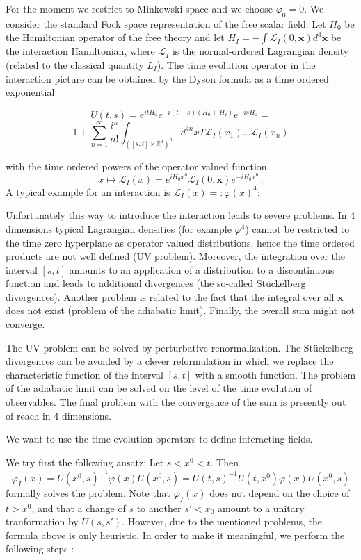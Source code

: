 \documentclass[12pt]{article}
\newcommand{\Lcal}{\mathcal {L}}
\newcommand{\ph}{\varphi}
\newcommand{\1}{\mathds{1}}                         %
\begin{document}
{{For the moment we restrict to Minkowski space and we choose $\ph_0=0$. We consider the standard Fock space representation of the free scalar field. Let $H_0$ be the Hamiltonian operator of the free theory and let  $H_I=-\int  \Lcal_I(0,\mathbf x)d^3\mathbf x$ be the interaction Hamiltonian, where $\Lcal_I$ is the normal-ordered Lagrangian density (related to the classical quantity ${L_I}$). The time evolution operator in the interaction picture can be obtained by the Dyson formula as a time ordered exponential

{\[U(t,s)=e^{itH_0}e^{-i(t-s)(H_0+H_I)}e^{-isH_0}=\]
\[1+\sum_{n=1}^\infty\frac{i^n}{n!}\int_ {([s,t]\times\mathbb R^3)^n}d^{4n}xT\Lcal_I(x_1)\dots \Lcal_I(x_n)\]}
%
{with the time ordered powers of the operator valued function
\[x\mapsto \Lcal_I(x)=e^{iH_0x^0}\Lcal_I(0,\mathbf x)e^{-iH_0x^0}\,.
\]
{A typical example for an interaction is $\Lcal_I(x)=:\ph(x)^4:$}

Unfortunately this way to introduce the interaction leads to severe problems. In 4 dimensions typical Lagrangian densities (for example $\ph^4$) cannot be restricted to the time zero hyperplane as operator valued distributions, hence the time ordered products are not well defined (UV problem). Moreover, the integration over the interval $[s,t]$ amounts to an application of a distribution to a discontinuous function and leads to additional divergences (the so-called St\"uckelberg divergences). Another problem is related to the fact that the integral over all $\mathbf x$ does not exist (problem of the adiabatic limit). Finally, the overall sum might not converge.

{The UV problem can be solved by perturbative renormalization. The St\"uckelberg divergences can be avoided by a clever reformulation in which we replace the characteristic function of the interval $[s,t]$ with a smooth function. The problem of the adiabatic limit can be solved on the level of the time evolution of observables. The final problem with the convergence of the sum is presently out of reach in 4 dimensions.}

We want to use the time evolution operators to define interacting fields.
{We try first the following ansatz: Let $s<x^0<t$. Then
\[\ph_I(x)=U(x^0,s)^{-1}\ph(x)U(x^0,s)=U(t,s)^{-1}U(t,x^0)\ph(x)U(x^0,s)\]
formally solves the problem.
Note that $\ph_I(x)$ does not depend on the choice of $t>x^0$, and that a change of $s$ to another $s'<x_0$ amount to a unitary tranformation by $U(s,s')$. However, due to the mentioned problems, the formula above is only heuristic. In order to make it meaningful, we perform the following steps :

}}}}
\end{document}
